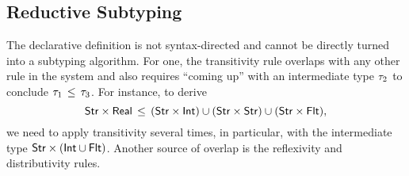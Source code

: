 \subsection{Reductive Subtyping}\label{sec:redsub}

The declarative definition is not syntax-directed
and cannot be directly turned into a subtyping algorithm.
For one, the transitivity rule  
overlaps with any other rule in the system
and also requires ``coming up'' with an intermediate type $\tau_2$
to conclude $\tau_1 \, \leq \, \tau_3$.
For instance, to derive %
\[\mathsf{Str} \times \mathsf{Real} \, \leq \, (\mathsf{Str} \times \mathsf{Int}) \cup (\mathsf{Str} \times \mathsf{Str}) 
	\cup (\mathsf{Str} \times \mathsf{Flt}),\]
we need to apply transitivity several times, in particular, 
with the intermediate type $\mathsf{Str} \times (\mathsf{Int} \cup \mathsf{Flt})$.
Another source of overlap is the reflexivity and distributivity rules.

